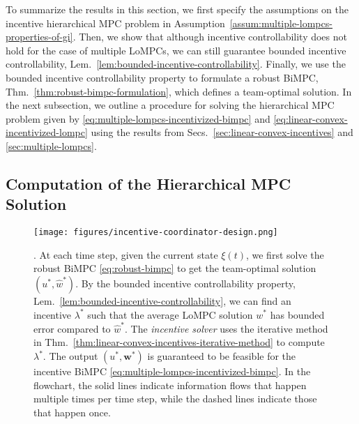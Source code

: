 To summarize the results in this section, we first specify the assumptions on the incentive hierarchical MPC problem in Assumption~\ref{assum:multiple-lompcs-properties-of-gi}.
Then, we show that although incentive controllability does not hold for the case of multiple LoMPCs, we can still guarantee bounded incentive controllability, Lem.~\ref{lem:bounded-incentive-controllability}.
Finally, we use the bounded incentive controllability property to formulate a robust BiMPC, Thm.~\ref{thm:robust-bimpc-formulation}, which defines a team-optimal solution.
In the next subsection, we outline a procedure for solving the hierarchical MPC problem given by \eqref{eq:multiple-lompcs-incentivized-bimpc} and \eqref{eq:linear-convex-incentivized-lompc} using the results from Secs.~\ref{sec:linear-convex-incentives} and \ref{sec:multiple-lompcs}.

\subsection{Computation of the Hierarchical MPC Solution}
\label{subsec:computation-of-the-hierarchical-mpc-solution}

\begin{figure}[tp]
    \centering
    \texttt{[image: figures/incentive-coordinator-design.png]}
    \caption{.
    At each time step, given the current state $\xi(t)$, we first solve the robust BiMPC \eqref{eq:robust-bimpc} to get the team-optimal solution $(u^*, \hat{w}^*)$.
    By the bounded incentive controllability property, Lem.~\ref{lem:bounded-incentive-controllability}, we can find an incentive $\lambda^*$ such that the average LoMPC solution $w^*$ has bounded error compared to $\hat{w}^*$.
    The \emph{incentive solver} uses the iterative method in Thm.~\ref{thm:linear-convex-incentives-iterative-method} to compute $\lambda^*$.
    The output $(u^*, \bm{w}^*)$ is guaranteed to be feasible for the incentive BiMPC \eqref{eq:multiple-lompcs-incentivized-bimpc}.
    In the flowchart, the solid lines indicate information flows that happen multiple times per time step, while the dashed lines indicate those that happen once.
    }
    \label{fig:hierarchical-mpc-solution-procedure}
\end{figure}

